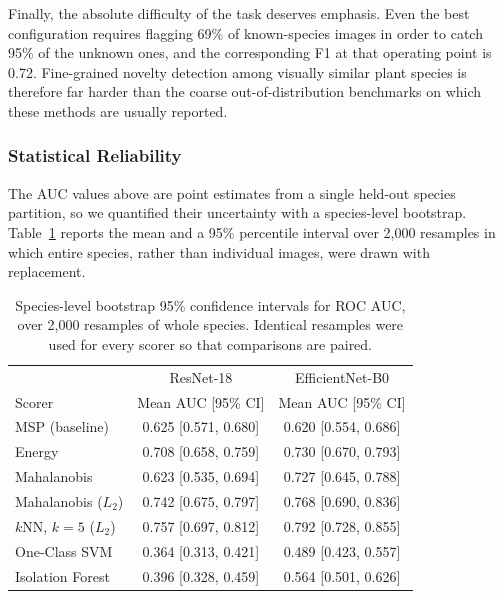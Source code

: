 \documentclass[11pt]{article}
\begin{document}
Finally, the absolute difficulty of the task deserves emphasis. Even the best configuration requires flagging 69\% of known-species images in order to catch 95\% of the unknown ones, and the corresponding F1 at that operating point is 0.72. Fine-grained novelty detection among visually similar plant species is therefore far harder than the coarse out-of-distribution benchmarks on which these methods are usually reported.

\subsubsection{Statistical Reliability}

The AUC values above are point estimates from a single held-out species partition, so we quantified their uncertainty with a species-level bootstrap. Table~\ref{tab:bootstrap} reports the mean and a 95\% percentile interval over 2,000 resamples in which entire species, rather than individual images, were drawn with replacement.

\begin{table}[H]
\centering
\caption{Species-level bootstrap 95\% confidence intervals for ROC AUC, over 2,000 resamples of whole species. Identical resamples were used for every scorer so that comparisons are paired.}
\label{tab:bootstrap}

\begin{tabular}{lcc}
\toprule
& ResNet-18 & EfficientNet-B0 \\
Scorer & Mean AUC [95\% CI] & Mean AUC [95\% CI] \\
\midrule
MSP (baseline)         & 0.625 [0.571, 0.680] & 0.620 [0.554, 0.686] \\
Energy                 & 0.708 [0.658, 0.759] & 0.730 [0.670, 0.793] \\
Mahalanobis            & 0.623 [0.535, 0.694] & 0.727 [0.645, 0.788] \\
Mahalanobis ($L_2$)    & 0.742 [0.675, 0.797] & 0.768 [0.690, 0.836] \\
$k$NN, $k{=}5$ ($L_2$) & 0.757 [0.697, 0.812] & 0.792 [0.728, 0.855] \\
One-Class SVM          & 0.364 [0.313, 0.421] & 0.489 [0.423, 0.557] \\
Isolation Forest       & 0.396 [0.328, 0.459] & 0.564 [0.501, 0.626] \\
\bottomrule
\end{tabular}
\end{table}
\end{document}
